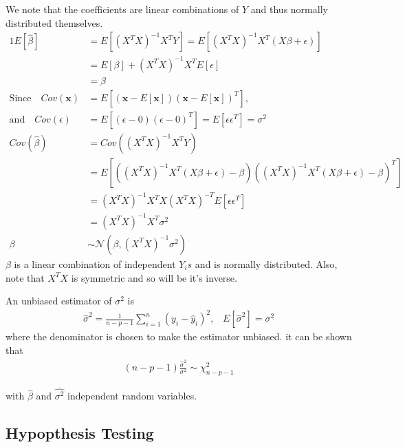 \documentclass[../statistical_learning_notes.tex]{subfiles}
\begin{document}
We note that the coefficients are linear combinations of $Y$ and thus normally distributed themselves.
\begin{alignat*}{1}
    E[\hat{\beta}] &= E[(X^{T}X)^{-1}X^{T}Y] = E[(X^{T}X)^{-1}X^{T}(X\beta + \epsilon)]\\
    &= E[\beta] + (X^{T}X)^{-1}X^{T}E[\epsilon]\\
    &= \beta\\
    \text{Since} \quad Cov(\mathbf{x}) &= E[(\mathbf{x} - E[\mathbf{x}])(\mathbf{x} - E[\mathbf{x}])^{T}]\text{,}\\
    \text{and} \quad Cov(\epsilon) &= E[(\epsilon - 0)(\epsilon - 0)^{T}] = E[\epsilon \epsilon^{T}] = \sigma^{2}\\
    Cov(\hat{\beta}) &= Cov((X^{T}X)^{-1}X^{T}Y)\\ &= E[((X^{T}X)^{-1}X^{T}(X\beta + \epsilon) - \beta)((X^{T}X)^{-1}X^{T}(X\beta + \epsilon) - \beta)^{T}]\\
    &= (X^{T}X)^{-1}X^{T}X(X^{T}X)^{-T}E[\epsilon \epsilon^{T}]\\
    &= (X^{T}X)^{-1}X^{T}\sigma^{2}\\
    \beta &\sim \mathcal{N}(\beta, (X^{T}X)^{-1}\sigma^{2})
\end{alignat*}
$\beta$ is a linear combination of independent $Y_{i}s$ and is normally distributed. Also, note that $X^{T}X$ is symmetric and so will be it's inverse.\newline

An unbiased estimator of $\sigma^{2}$ is
\begin{align*}
    \hat{\sigma}^{2} = \frac{1}{n-p-1} \sum_{i=1}^{n} (y_{i} - \hat{y}_{i})^{2} \text{,}\quad E[\hat{\sigma}^{2}] = \sigma^{2}
\end{align*}
where the denominator is chosen to make the estimator unbiased. it can be shown that
\begin{align*}
    (n - p - 1) \frac{\hat{\sigma}^{2}}{\sigma^{2}} \sim \chi_{n-p-1}^{2}
\end{align*}

with $\hat{\beta}$ and $\hat{\sigma^{2}}$ independent random variables.

\subsection{Hypopthesis Testing}
\end{document}
